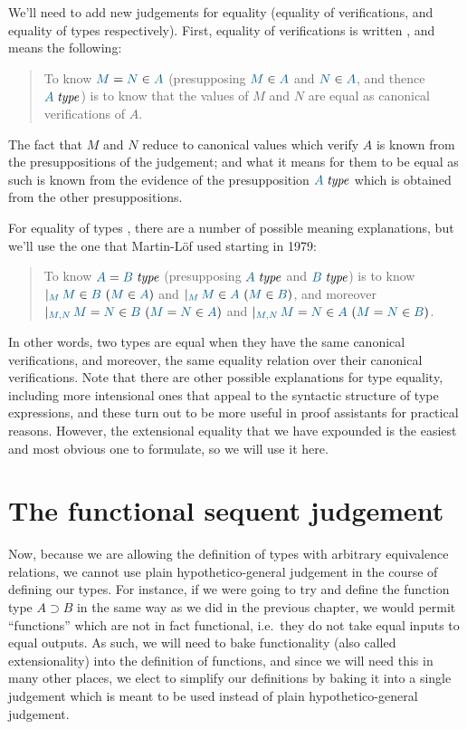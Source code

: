 We'll need to add new judgements for equality (equality of
verifications, and equality of types respectively). First, equality of
verifications is written , and means the
following:

\begin{quote}
  To know $\ever{M}{N}{A}$ (presupposing $\ver{M}{A}$ and $\ver{N}{A}$,
  and thence $\isset{A}$) is to know that the values of $M$ and $N$ are
  equal as canonical verifications of $A$.
\end{quote}

The fact that $M$ and $N$ reduce to canonical values which verify $A$
is known from the presuppositions of the judgement; and what it means
for them to be equal as such is known from the evidence of the
presupposition $\isset{A}$ which is obtained from the other
presuppositions.

For equality of types , there are a number of
possible meaning explanations, but we'll use the one that Martin-L\"of
used starting in 1979:

\begin{quote}
  To know $\eisset{A}{B}$ (presupposing $\isset{A}$ and $\isset{B}$) is to know
$\genj{M}{\hyp{\ver{M}{B}}{\ver{M}{A}}}$ and
$\genj{M}{\hyp{\ver{M}{A}}{\ver{M}{B}}}$, and moreover
$\genj{M,N}{\hyp{\ever{M}{N}{B}}{\ever{M}{N}{A}}}$ and
$\genj{M,N}{\hyp{\ever{M}{N}{A}}{\ever{M}{N}{B}}}$.
\end{quote}

In other words, two types are equal when they have the same canonical
verifications, and moreover, the same equality relation over their canonical
verifications. Note that there are other possible explanations for type
equality, including more intensional ones that appeal to the syntactic
structure of type expressions, and these turn out to be more useful in proof
assistants for practical reasons. However, the extensional equality that we
have expounded is the easiest and most obvious one to formulate, so we will
use it here.

\section{The functional sequent judgement}

Now, because we are allowing the definition of types with arbitrary equivalence
relations, we cannot use plain hypothetico-general judgement in the course of
defining our types. For instance, if we were going to try and define the
function type $A\supset B$ in the same way as we did in the previous chapter,
we would permit ``functions'' which are not in fact functional, i.e.\ they do
not take equal inputs to equal outputs. As such, we will need to bake
functionality (also called extensionality) into the definition of functions,
and since we will need this in many other places, we elect to simplify our
definitions by baking it into a single judgement which is meant to be used
instead of plain hypothetico-general judgement.

